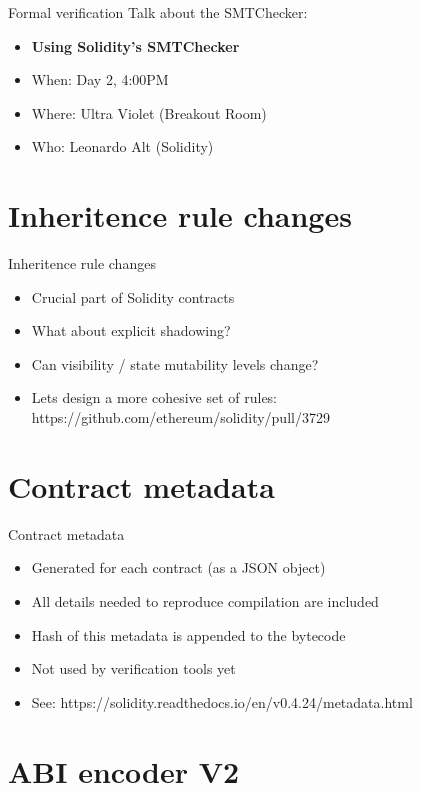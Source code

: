 \documentclass[aspectratio=169,10pt]{beamer}
\begin{document}
\begin{frame}{Formal verification}
  Talk about the SMTChecker:
  \begin{itemize}
    \item \textbf{Using Solidity's SMTChecker}
    \item When: Day 2, 4:00PM
    \item Where: Ultra Violet (Breakout Room)
    \item Who: Leonardo Alt (Solidity)
	\end{itemize}
\end{frame}

\section{Inheritence rule changes}

\begin{frame}{Inheritence rule changes}
  \begin{itemize}
    \item Crucial part of Solidity contracts
    \item What about explicit shadowing?
    \item Can visibility / state mutability levels change?
    \item Lets design a more cohesive set of rules: https://github.com/ethereum/solidity/pull/3729
	\end{itemize}
\end{frame}

\section{Contract metadata}

\begin{frame}{Contract metadata}
  \begin{itemize}
    \item Generated for each contract (as a JSON object)
    \item All details needed to reproduce compilation are included
    \item Hash of this metadata is appended to the bytecode
    \item Not used by verification tools yet
    \item See: https://solidity.readthedocs.io/en/v0.4.24/metadata.html
	\end{itemize}
\end{frame}

\section{ABI encoder V2}
\end{document}
